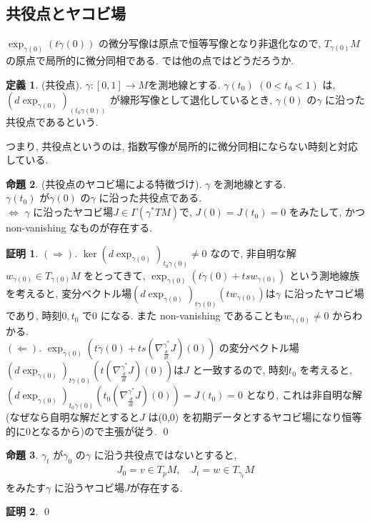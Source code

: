 \documentclass[10pt, fleqn, label-section=none]{bxjsarticle}
\theoremstyle{definition}
\newtheorem{dfn}{定義}[section]
\newtheorem{prop}[dfn]{命題}
\newtheorem*{pf*}{証明}
\newcommand{\LR}{\Leftrightarrow}
\newcommand{\naraba}{\Rightarrow}
\newcommand{\gyaku}{\Leftarrow}
\renewcommand{\-}{\hyphen}
\begin{document}
\subsection{共役点とヤコビ場}
$\exp_{\gamma(0)}(t\dot \gamma(0))$ の微分写像は原点で恒等写像となり非退化なので, $T_{\gamma(0)} M$ の原点で局所的に微分同相である. では他の点ではどうだろうか. 

\begin{dfn}(共役点).
$\gamma : [0,1] \rightarrow M$を測地線とする. $\gamma(t_0)\,\, (0 < t_0 < 1)$ は, $(d\exp_{\gamma(0)})_{(t_0 \dot \gamma (0))} $ が線形写像として退化しているとき, $\gamma(0)$ の$\gamma$ に沿った共役点であるという. 
\end{dfn}

つまり, 共役点というのは, 指数写像が局所的に微分同相にならない時刻と対応している. \\

\begin{prop}(共役点のヤコビ場による特徴づけ).
$\gamma$ を測地線とする. \\
$\gamma(t_0)$ が$\gamma(0)$ の$\gamma$ に沿った共役点である. \\
$\LR$ $\gamma$ に沿ったヤコビ場$J \in \Gamma(\gamma ^* TM)$で, $J(0) = J(t_0) = 0$ をみたして, かつ non-vanishing なものが存在する. 
\end{prop}
\begin{pf*}
$(\naraba)$. $\ker (d \exp _{\gamma(0)})_{t_0 \dot \gamma(0)} \neq 0$ なので, 非自明な解$w_{\gamma(0)} \in T_{\gamma(0)} M$ をとってきて, $\exp_{\gamma(0)} (t \dot \gamma(0) + ts w _{\gamma (0)})$ という測地線族を考えると, 変分ベクトル場$(d\exp_{\gamma(0)})_{t\dot \gamma(0)} (t w _{\gamma(0)})$は$\gamma $ に沿ったヤコビ場であり, 時刻$0, t_0$ で$0$ になる. また non-vanishing であることも$w_{\dot \gamma(0)} \neq 0$ からわかる. \\
$(\gyaku)$. $\exp_{\gamma(0)} (t \dot \gamma(0) + t s (\nabla ^{\gamma ^* } _{\frac{d}{dt} } J) (0) ) $ の変分ベクトル場$(d\exp_{\gamma(0)})_{t\dot \gamma(0)} (t (\nabla ^{\gamma ^* } _{\frac{d}{dt} } J) (0)  )$は$J$ と一致するので, 時刻$t_0$ を考えると,  $(d\exp_{\gamma(0)})_{t_0 \dot \gamma(0)} (t_0 (\nabla ^{\gamma ^* } _{\frac{d}{dt} } J) (0)  ) = J(t_0) = 0$ となり, これは非自明な解(なぜなら自明な解だとすると$J$ は(0,0) を初期データとするヤコビ場になり恒等的に0となるから)ので主張が従う.
\qed
\end{pf*}

\begin{prop}
$\gamma_t$ が$\gamma_0$ の$\gamma$ に沿う共役点ではないとすると, 
\begin{align*} J_0 = v \in T_pM, \quad J_t = w \in T_{\gamma_t} M \end{align*}
をみたす$\gamma$ に沿うヤコビ場$J$が存在する. 
\end{prop}
\begin{pf*}

\qed
\end{pf*}
\end{document}
